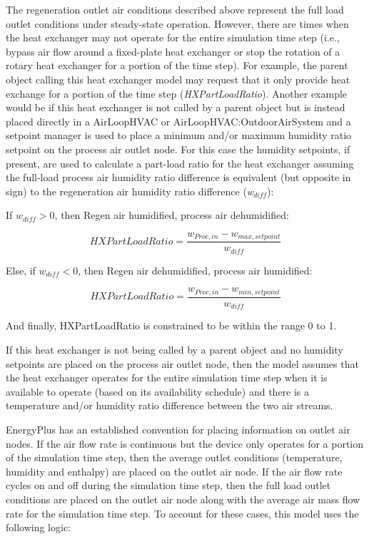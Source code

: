 The regeneration outlet air conditions described above represent the full load outlet conditions under steady-state operation. However, there are times when the heat exchanger may not operate for the entire simulation time step (i.e., bypass air flow around a fixed-plate heat exchanger or stop the rotation of a rotary heat exchanger for a portion of the time step). For example, the parent object calling this heat exchanger model may request that it only provide heat exchange for a portion of the time step (\emph{HXPartLoadRatio}). Another example would be if this heat exchanger is not called by a parent object but is instead placed directly in a AirLoopHVAC or AirLoopHVAC:OutdoorAirSystem and a setpoint manager is used to place a minimum and/or maximum humidity ratio setpoint on the process air outlet node. For this case the humidity setpoints, if present, are used to calculate a part-load ratio for the heat exchanger assuming the full-load process air humidity ratio difference is equivalent (but opposite in sign) to the regeneration air humidity ratio difference (\emph{w\(_{diff}\)}):

If $w_{diff}>0$, then Regen air humidified, process air dehumidified:

\begin{equation}
  HXPartLoadRatio = \frac{w_{Proc,in} - w_{max, setpoint}}{w_{diff}}
\end{equation}

Else, if $w_{diff} <0$, then Regen air dehumidified, process air humidified:

\begin{equation}
  HXPartLoadRatio = \frac{w_{Proc,in} - w_{min, setpoint}}{w_{diff}}
\end{equation}

And finally, HXPartLoadRatio is constrained to be within the range 0 to 1.

If this heat exchanger is not being called by a parent object and no humidity setpoints are placed on the process air outlet node, then the model assumes that the heat exchanger operates for the entire simulation time step when it is available to operate (based on its availability schedule) and there is a temperature and/or humidity ratio difference between the two air streams.

EnergyPlus has an established convention for placing information on outlet air nodes. If the air flow rate is continuous but the device only operates for a portion of the simulation time step, then the average outlet conditions (temperature, humidity and enthalpy) are placed on the outlet air node. If the air flow rate cycles on and off during the simulation time step, then the full load outlet conditions are placed on the outlet air node along with the average air mass flow rate for the simulation time step. To account for these cases, this model uses the following logic:

